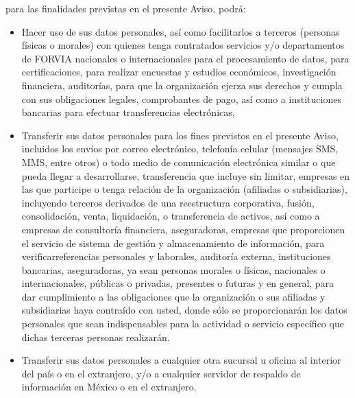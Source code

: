\documentclass[letterpaper,12pt]{article}
\begin{document}
\begin{sloppypar}
\begin{enumerate}
        para las finalidades previstas en el presente Aviso, podrá:

        \begin{itemize}
            \item Hacer uso de sus datos personales, así como facilitarlos a terceros (personas físicas o
            morales) con quienes tenga contratados servicios y/o departamentos de FORVIA nacionales o internacionales para el procesamiento de datos, para certificaciones, para realizar encuestas y estudios económicos, investigación financiera, auditorías, para que la organización ejerza sus derechos y cumpla con sus obligaciones legales, comprobantes de pago, así como a instituciones bancarias para efectuar transferencias electrónicas.
            \item Transferir sus datos personales para los fines previstos en el presente Aviso, incluidos
            los envíos por correo electrónico, telefonía celular (mensajes SMS, MMS, entre otros) o
            todo medio de comunicación electrónica similar o que pueda llegar a desarrollarse, transferencia que incluye sin limitar, empresas en las que participe o tenga relación de la organización (afiliadas o subsidiarias), incluyendo terceros derivados de una reestructura corporativa, fusión, consolidación, venta, liquidación, o transferencia de activos, así
            como a empresas de consultoría financiera, aseguradoras, empresas que proporcionen
            el servicio de sistema de gestión y almacenamiento de información, para verificarreferencias personales y laborales, auditoría externa, instituciones bancarias,
            aseguradoras, ya sean personas morales o físicas, nacionales o internacionales,
            públicas o privadas, presentes o futuras y en general, para dar cumplimiento a las
            obligaciones que la organización o sus afiliadas y subsidiarias haya contraído con usted, donde
            sólo se proporcionarán los datos personales que sean indispensables para la actividad
            o servicio específico que dichas terceras personas realizarán.
            \item Transferir sus datos personales a cualquier otra sucursal u oficina al interior del país o
            en el extranjero, y/o a cualquier servidor de respaldo de información en México o en el
            extranjero.
            
        \end{itemize}
        
        
\end{enumerate}



\end{sloppypar}
\end{document}
